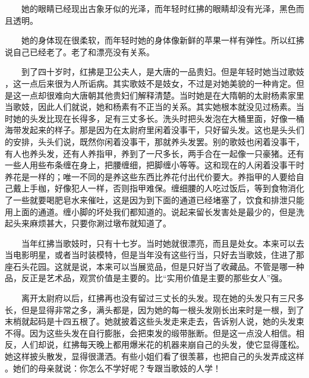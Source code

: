  　　她的眼睛已经现出古象牙似的光泽，而年轻时红拂的眼睛却没有光泽，黑色而 且透明。 

　　她的身体现在很柔软，而年轻时她的身体像新鲜的苹果一样有弹性。所以红拂 说自己已经老了。老了和漂亮没有关系。

 　　到了四十岁时，红拂是卫公夫人，是大唐的一品贵妇。但是年轻时她当过歌妓 ，这一点后来很为人所诟病。其实歌妓不是妓女，不过是对她美貌的一种肯定。但 是这一点却很难向大唐朝其他贵妇们解释清楚。当时她是在大隋朝的太尉杨素家里 当歌妓，因此人们就说，她和杨素有不正当的关系。其实她根本就没见过杨素。当 时她的头发比现在长得多，足有三丈多长。洗头时把头发泡在大桶里面，好像一桶 海带发起来的样子。那是因为在太尉府里闲着没事干，只好留头发。这也是头头们 的安排，头头们说，既然你闲着没事干，那就养头发罢。别的歌妓也闲着没事干， 有人也养头发，还有人养指甲，养到了一尺多长，两手合在一起像一只豪猪。还有 一些人用些布条缠在身上，把腰缠细，把脚缠小等等。这和现在的人闲着没事干时 养花是一样的；唯一不同的是养这些东西比养花付出代价要大。养指甲的人要给自 己戴上手枷，好像犯人一样，否则指甲难保。缠细腰的人吃过饭后，等到食物消化 了一些就要喝肥皂水来催吐，这是因为到下面的通道已经堵塞了，饮食和排泄只能 用上面的通道。缠小脚的坏处我们都知道的。说起来留长发害处是最少的，但是洗 起头来麻烦甚大，只要你涮过墩布就知道了。

 　　当年红拂当歌妓时，只有十七岁。当时她就很漂亮，而且是处女。本来可以去 当电影明星，或者当时装模特，但是当年没有这些行当，只好去当歌妓，住进了那 座石头花园。这就是说，本来可以当展览品，但是只好当了收藏品。不管是哪一种 品，反正是艺术品，观赏价值是主要的。比“实用价值是主要的那些女人”强。

 　　离开太尉府以后，红拂再也没有留过三丈长的头发。现在她的头发只有三尺多 长，但是显得非常之多，满头都是，因为她的每一根头发刚长出来时是一根，到了 末梢就起码是十四五根了。她就披着这些头发走来走去，告诉别人说，她的头发束 不得。因为这些头发在自行膨胀，会把束发的缎带胀断。但是这一点没人相信。相 反，人们却说，红拂每天晚上都用爆米花的机器来崩自己的头发，使它显得蓬松。 她这样披头散发，显得很潇洒。有些小姐们看了很羡慕，也把自己的头发弄成这样 。她们的母亲就说：你怎么不学好呢？专跟当歌妓的人学！


